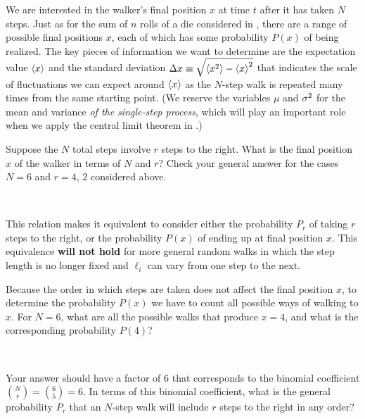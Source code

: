 We are interested in the walker's final position $x$ at time $t$ after it has taken $N$ steps.
Just as for the sum of $n$ rolls of a die considered in , there are a range of possible final positions $x$, each of which has some probability $P(x)$ of being realized.
The key pieces of information we want to determine are the expectation value $\left\langle x \right\rangle$ and the standard deviation $\Delta x \equiv \sqrt{\left\langle x^2 \right\rangle - \left\langle x \right\rangle^2}$ that indicates the scale of fluctuations we can expect around $\left\langle x \right\rangle$ as the $N$-step walk is repeated many times from the same starting point.
(We reserve the variables $\mu$ and $\sigma^2$ for the mean and variance \textit{of the single-step process}, which will play an important role when we apply the central limit theorem in .)

Suppose the $N$ total steps involve $r$ steps to the right.
What is the final position $x$ of the walker in terms of $N$ and $r$?
Check your general answer for the cases $N = 6$ and $r = 4$, $2$ considered above.
\begin{mdframed}
  \ \\[100 pt]
\end{mdframed}
This relation makes it equivalent to consider either the probability $P_r$ of taking $r$ steps to the right, or the probability $P(x)$ of ending up at final position $x$.
This equivalence \textbf{will not hold} for more general random walks in which the step length is no longer fixed and $\ell_i$ can vary from one step to the next.

Because the order in which steps are taken does not affect the final position $x$, to determine the probability $P(x)$ we have to count all possible ways of walking to $x$.
For $N = 6$, what are all the possible walks that produce $x = 4$, and what is the corresponding probability $P(4)$?
\begin{mdframed}
  \ \\[100 pt]
\end{mdframed}
Your answer should have a factor of $6$ that corresponds to the binomial coefficient $\binom{N}{r} = \binom{6}{5} = 6$.
In terms of this binomial coefficient, what is the general probability $P_r$ that an $N$-step walk will include $r$ steps to the right in any order?
\begin{mdframed}
  \ \\[100 pt]
\end{mdframed}

